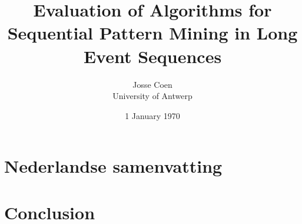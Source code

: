 \documentclass{scrartcl}
\theoremstyle{definition}
\begin{document}
\frenchspacing

\title{Evaluation of Algorithms for Sequential Pattern Mining in Long Event Sequences}
\subtitle{}

\author{Josse Coen
\vspace{.3cm}\\
%
University of Antwerp
%
}

\date{1 January 1970}

\maketitle

\tableofcontents



\section{Nederlandse samenvatting}

\newpage


\newpage


\newpage





\section{Conclusion}
\end{document}

